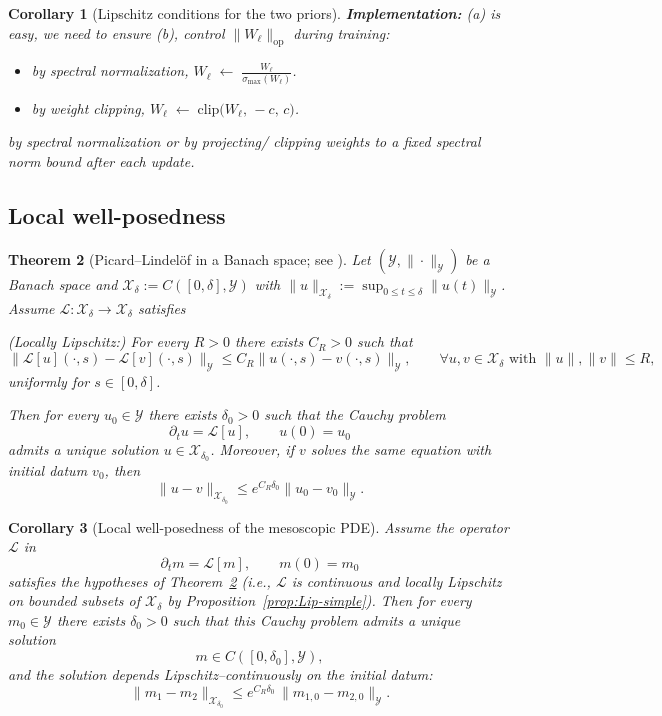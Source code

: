 \documentclass[11pt,a4paper]{article}
\theoremstyle{plain}
\newtheorem{theorem}{Theorem}[section]
\newtheorem{corollary}[theorem]{Corollary}
\theoremstyle{definition}
\theoremstyle{remark}
\begin{document}
\begin{corollary}[Lipschitz conditions for the two priors]
	\medskip\noindent
	\textbf{Implementation:} (a) is easy, we need to ensure (b), control $\|W_\ell\|_{\mathrm{op}}$ during training:
	\begin{itemize}
		\item[(i)] by spectral normalization, $
			      W_\ell \;\leftarrow\;
			      \frac{W_\ell}{\sigma_{\max}(W_\ell)}$.
		\item[(ii)] by weight clipping, $W_\ell \;\leftarrow\;
			      \mathrm{clip}\bigl(W_\ell,\,-c,\,c\bigr)$.
	\end{itemize}
	by spectral normalization or by projecting/ clipping weights
	to a fixed spectral norm bound after each update.

\end{corollary}



\subsection{Local well-posedness}

\begin{theorem}[Picard–Lindelöf in a Banach space; see \cite{pazy2012semigroups}]\label{thm:picard}
	Let $(\mathcal Y,\|\cdot\|_{\mathcal Y})$ be a Banach space and
	$\mathcal X_\delta := C([0,\delta],\mathcal Y)$ with
	$\|u\|_{\mathcal X_\delta} := \sup_{0\le t\le \delta}\|u(t)\|_{\mathcal Y}$.
	Assume $\mathcal L:\mathcal X_\delta\to\mathcal X_\delta$ satisfies

	(Locally Lipschitz:)
	For every $R>0$ there exists $C_R>0$ such that
	\[
		\|\mathcal L[u](\cdot,s)-\mathcal L[v](\cdot,s)\|_{\mathcal Y}
		\le C_R\|u(\cdot,s)-v(\cdot,s)\|_{\mathcal Y},
		\qquad
		\forall u,v\in\mathcal X_\delta
		\text{ with }\|u\|,\|v\|\le R,
	\]
	uniformly for $s\in[0,\delta]$.

	Then for every $u_0\in\mathcal Y$ there exists $\delta_0>0$ such that the Cauchy
	problem
	\[
		\partial_t u = \mathcal L[u], \qquad u(0)=u_0
	\]
	admits a unique solution $u\in \mathcal X_{\delta_0}$.
	Moreover, if $v$ solves the same equation with initial datum $v_0$, then
	\[
		\|u-v\|_{\mathcal X_{\delta_0}}
		\le e^{C_R\delta_0}\|u_0-v_0\|_{\mathcal Y}.
	\]
\end{theorem}

\begin{corollary}[Local well-posedness of the mesoscopic PDE]\label{thm:wellposed}
	Assume the operator $\mathcal L$ in
	\[
		\partial_t m = \mathcal L[m],\qquad m(0)=m_0
	\]
	satisfies the hypotheses of Theorem~\ref{thm:picard}
	(\emph{i.e.}, $\mathcal L$ is continuous and locally Lipschitz
	on bounded subsets of $\mathcal X_\delta$ by Proposition~\ref{prop:Lip-simple}).
	Then for every $m_0\in \mathcal Y$ there exists $\delta_0>0$
	such that this Cauchy problem admits a unique solution
	\[
		m \in C([0,\delta_0],\mathcal Y),
	\]
	and the solution depends Lipschitz–continuously on the initial datum:
	\[
		\|m_1 - m_2\|_{\mathcal X_{\delta_0}}
		\le e^{C_R\delta_0}\,\|m_{1,0} - m_{2,0}\|_{\mathcal Y}.
	\]
\end{corollary}
\end{document}
